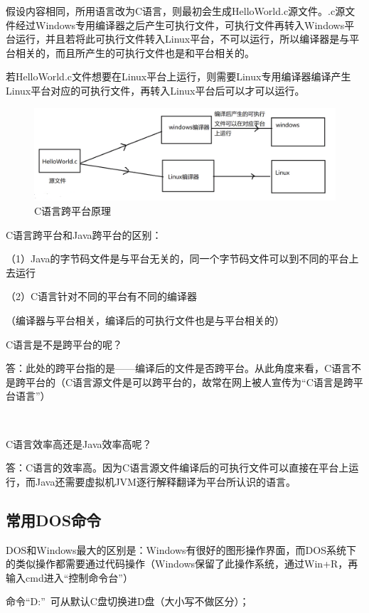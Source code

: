 \documentclass{article}
\begin{document}
	假设内容相同，所用语言改为C语言，则最初会生成HelloWorld.c源文件。.c源文件经过Windows专用编译器之后产生可执行文件，可执行文件再转入Windows平台运行，并且若将此可执行文件转入Linux平台，不可以运行，所以编译器是与平台相关的，而且所产生的可执行文件也是和平台相关的。
	
	若HelloWorld.c文件想要在Linux平台上运行，则需要Linux专用编译器编译产生Linux平台对应的可执行文件，再转入Linux平台后可以才可以运行。
	
		\begin{figure}[ht]
		\centering
		\includegraphics[width=120mm]{4.png}
		\caption{C语言跨平台原理}
		\label{fig:label}
	\end{figure}
	
	C语言跨平台和Java跨平台的区别：
	
	\setlength{\parindent}{4em}
	（1）Java的字节码文件是与平台无关的，同一个字节码文件可以到不同的平台上去运行
	
	（2）C语言针对不同的平台有不同的编译器
	
	\setlength{\parindent}{6em}
	（编译器与平台相关，编译后的可执行文件也是与平台相关的）
	
	\setlength{\parindent}{2em}
	C语言是不是跨平台的呢？
	
	答：此处的跨平台指的是——编译后的文件是否跨平台。从此角度来看，C语言不是跨平台的（C语言源文件是可以跨平台的，故常在网上被人宣传为“C语言是跨平台语言”）
	
	\ 
	
	C语言效率高还是Java效率高呢？
	
	答：C语言的效率高。因为C语言源文件编译后的可执行文件可以直接在平台上运行，而Java还需要虚拟机JVM逐行解释翻译为平台所认识的语言。
	
	\subsection{常用DOS命令}

	DOS和Windows最大的区别是：Windows有很好的图形操作界面，而DOS系统下的类似操作都需要通过代码操作（Windows保留了此操作系统，通过Win+R，再输入cmd进入“控制命令台”）
	
	命令“D:”\ 可从默认C盘切换进D盘（大小写不做区分）；
	
\end{document}
